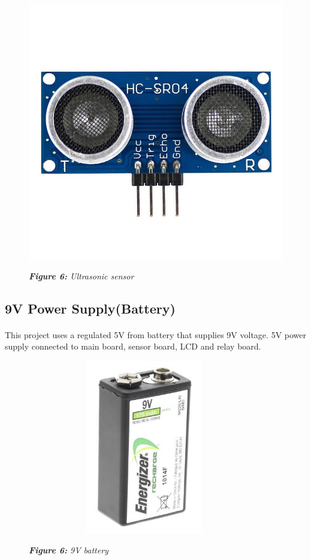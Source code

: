 \documentclass[12pt]{article}
\begin{document}
\begin{figure}
\includegraphics[scale=0.4]{ultra.jpg}   %
\begin{center}
\textit{\textbf{Figure 6:} Ultrasonic sensor}  %
\end{center}
\end{figure}
\newpage
\subsection*{9V Power Supply(Battery)}
\paragraph*{}
This project uses a regulated 5V from battery that supplies 9V voltage. 5V power supply connected to main board, sensor board, LCD and relay board. 
\newpage
\begin{figure}
\includegraphics[scale=0.4,height=3in,width=4in]{bat.jpg}   %
\begin{center}
\textit{\textbf{Figure 6:} 9V battery } %
\end{center}
\end{figure}
\newpage
\end{document}
